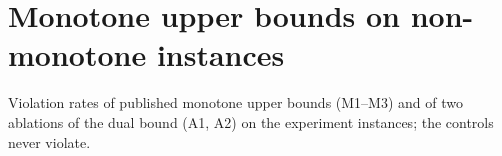 \documentclass[twocolumn]{article}
\begin{document}
\section*{Monotone upper bounds on non-monotone instances}
Violation rates of published monotone upper bounds (M1--M3) and of two ablations of the dual
bound (A1, A2) on the experiment instances; the controls never violate.




\end{document}
